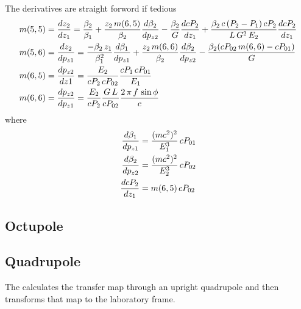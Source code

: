 \documentclass{book}
\begin{document}
The derivatives are straight forword if tedious
\begin{align}
  m(5,5) &= \frac{dz_2}{dz_1} = 
    \frac{\beta_2}{\beta_1} + 
    \frac{z_2 \, m(6,5)}{\beta_2} \frac{d\beta_2}{dp_{z2}} - 
    \frac{\beta_2}{G} \frac{dcP_2}{dz_1} +
    \frac{\beta_2 \, c \, (P_2 - P_1) \, c P_2}{L \, G^2 \, E_2} 
      \frac{dcP_2}{dz_1} \nonumber \\
  m(5,6) &= \frac{dz_2}{dp_{z1}} = 
    \frac{-\beta_2 \, z_1}{\beta_1^2} \frac{d\beta_1}{dp_{z1}} + 
    \frac{z_2 \, m(6,6)}{\beta_2} \frac{d\beta_2}{dp_{z2}} -
    \frac{\beta_2 ( c P_{02} \, m(6,6) - c P_{01})}{G} \nonumber \\
  m(6,5) &= \frac{dp_{z2}}{dz1} =
    \frac{E_2}{cP_2 \, cP_{02}} \frac{cP_1 \, cP_{01}}{E_1}  \\
  m(6,6) &= \frac{dp_{z2}}{dp_{z1}} = 
    \frac{E_2}{cP_2} \frac{G \, L}{c P_{02}} \frac{2 \, \pi \, f \, \sin\phi}{c}
    \nonumber
\end{align}
where
\begin{align}
  \frac{d\beta_1}{dp_{z1}}  &= \frac{(mc^2)^2}{E_1^3} \, cP_{01} \nonumber \\
  \frac{d\beta_2}{dp_{z2}}  &= \frac{(mc^2)^2}{E_2^3} \, cP_{02} \\
  \frac{dcP_2}{dz_1}        &= m(6,5) \, cP_{02}  \nonumber
\end{align}

\subsection{Octupole}

\subsection{Quadrupole}

The  calculates the transfer map through an upright
quadrupole and then transforms that map to the laboratory frame.
\end{document}
